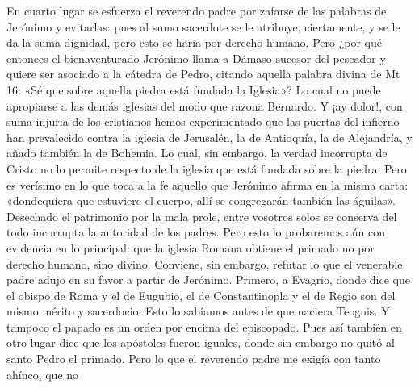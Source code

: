 En cuarto lugar se esfuerza el reverendo padre por zafarse de las palabras de Jerónimo y evitarlas: pues al sumo sacerdote se le atribuye, ciertamente, y se le da la suma dignidad, pero esto se haría por derecho humano. Pero ¿por qué entonces el bienaventurado Jerónimo llama a Dámaso sucesor del pescador y quiere ser asociado a la cátedra de Pedro, citando aquella palabra divina de Mt 16: «Sé que sobre aquella piedra está fundada la Iglesia»? Lo cual no puede apropiarse a las demás iglesias del modo que razona Bernardo. Y ¡ay dolor!, con suma injuria de los cristianos hemos experimentado que las puertas del infierno han prevalecido contra la iglesia de Jerusalén, la de Antioquía, la de Alejandría, y añado también la de Bohemia. Lo cual, sin embargo, la verdad incorrupta de Cristo no lo permite respecto de la iglesia que está fundada sobre la piedra. Pero es verísimo en lo que toca a la fe aquello que Jerónimo afirma en la misma carta: «dondequiera que estuviere el cuerpo, allí se congregarán también las águilas». Desechado el patrimonio por la mala prole, entre vosotros solos se conserva del todo incorrupta la autoridad de los padres. Pero esto lo probaremos aún con evidencia en lo principal: que la iglesia Romana obtiene el primado no por derecho humano, sino divino. Conviene, sin embargo, refutar lo que el venerable padre adujo en su favor a partir de Jerónimo. Primero, a Evagrio, donde dice que el obispo de Roma y el de Eugubio, el de Constantinopla y el de Regio son del mismo mérito y sacerdocio. Esto lo sabíamos antes de que naciera Teognis. Y tampoco el papado es un orden por encima del episcopado. Pues así también en otro lugar dice que los apóstoles fueron iguales, donde sin embargo no quitó al santo Pedro el primado. Pero lo que el reverendo padre me exigía con tanto ahínco, que no

